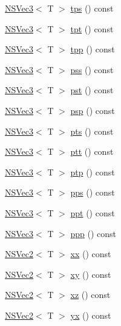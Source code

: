 \begin{DoxyCompactItemize}
\item 
\hyperlink{structNSVec3}{N\-S\-Vec3}$<$ T $>$ \hyperlink{structNSVec3_aad065d289de297c7b016fd7f56cfb2d6}{tps} () const 
\item 
\hyperlink{structNSVec3}{N\-S\-Vec3}$<$ T $>$ \hyperlink{structNSVec3_adc16be5f44fe24cf674257f932c7d298}{tpt} () const 
\item 
\hyperlink{structNSVec3}{N\-S\-Vec3}$<$ T $>$ \hyperlink{structNSVec3_ad88e60ffae377c655236a2b832aaf9ce}{tpp} () const 
\item 
\hyperlink{structNSVec3}{N\-S\-Vec3}$<$ T $>$ \hyperlink{structNSVec3_a44c9abbfbcca7eec34b76a0bf49cdea6}{pss} () const 
\item 
\hyperlink{structNSVec3}{N\-S\-Vec3}$<$ T $>$ \hyperlink{structNSVec3_a1fce23411b1792cb17c92a482b6ada9f}{pst} () const 
\item 
\hyperlink{structNSVec3}{N\-S\-Vec3}$<$ T $>$ \hyperlink{structNSVec3_adf7ee26d42218ca8626c2e7a799dd217}{psp} () const 
\item 
\hyperlink{structNSVec3}{N\-S\-Vec3}$<$ T $>$ \hyperlink{structNSVec3_ac8dc44c21c32cf3a6e9f57f21c13fff0}{pts} () const 
\item 
\hyperlink{structNSVec3}{N\-S\-Vec3}$<$ T $>$ \hyperlink{structNSVec3_aed79279dd88f4c4c9b10b8e60efc4437}{ptt} () const 
\item 
\hyperlink{structNSVec3}{N\-S\-Vec3}$<$ T $>$ \hyperlink{structNSVec3_a7c29133a4a24873628f61a0099cd66c3}{ptp} () const 
\item 
\hyperlink{structNSVec3}{N\-S\-Vec3}$<$ T $>$ \hyperlink{structNSVec3_acfe6747ac6c7d02b60947292f619064d}{pps} () const 
\item 
\hyperlink{structNSVec3}{N\-S\-Vec3}$<$ T $>$ \hyperlink{structNSVec3_a9cb171e5d4e1d439cab977f5a6fbfab3}{ppt} () const 
\item 
\hyperlink{structNSVec3}{N\-S\-Vec3}$<$ T $>$ \hyperlink{structNSVec3_a5421dd2f487caac597742682f924d312}{ppp} () const 
\item 
\hyperlink{structNSVec2}{N\-S\-Vec2}$<$ T $>$ \hyperlink{structNSVec3_a8cb7e99b94a64e2304fb3124fde91762}{xx} () const 
\item 
\hyperlink{structNSVec2}{N\-S\-Vec2}$<$ T $>$ \hyperlink{structNSVec3_ad8219932251db48672b0b2e751712da3}{xy} () const 
\item 
\hyperlink{structNSVec2}{N\-S\-Vec2}$<$ T $>$ \hyperlink{structNSVec3_a7f6be918d972415bba590a617049d285}{xz} () const 
\item 
\hyperlink{structNSVec2}{N\-S\-Vec2}$<$ T $>$ \hyperlink{structNSVec3_a661a0323a7cc81829109cc8080ae1704}{yx} () const 

\end{DoxyCompactItemize}
